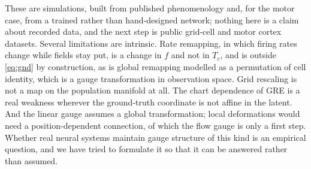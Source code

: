 \documentclass{article}
\theoremstyle{plain}
\begin{document}
These are simulations, built from published phenomenology and, for the motor
case, from a trained rather than hand-designed network; nothing here is a claim
about recorded data, and the next step is public grid-cell and motor cortex
datasets. Several limitations are intrinsic. Rate remapping, in which firing
rates change while fields stay put, is a change in $f$ and not in $T_c$, and is
outside \eqref{eq:gnd} by construction, as is global remapping modelled as a
permutation of cell identity, which is a gauge transformation in observation
space. Grid rescaling is not a map on the population manifold at all. The chart
dependence of GRE is a real weakness wherever the ground-truth coordinate is not
affine in the latent. And the linear gauge assumes a global transformation; local
deformations would need a position-dependent connection, of which the flow gauge
is only a first step. Whether real neural systems maintain gauge structure of
this kind is an empirical question, and we have tried to formulate it so that it
can be answered rather than assumed.

\label{endofbody}
\clearpage



\clearpage
\appendix

\end{document}
